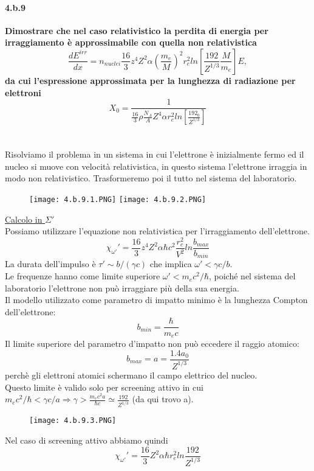 \documentclass[twoside]{article}
\begin{document}
\paragraph{4.b.9}\textbf{Dimostrare che nel caso relativistico la perdita di energia per irraggiamento è approssimabile con quella non relativistica
\[
\frac{dE^{irr}}{dx}=n_{nuclei}\frac{16}{3}z^4Z^2\alpha \left(\frac{m_e}{M} \right)^2 r_e^2 ln\left[ \frac{192}{Z^{1/3}}\frac{M}{m_e} \right]E,
\]
da cui l'espressione approssimata per la lunghezza di radiazione per elettroni
\[
X_0=\frac{1}{\frac{16}{3}\rho \frac{N_A}{A}Z^4 \alpha r_e^2 ln\left[\frac{192_0}{Z^{1/3}} \right]}
\]
}\\
\\
Risolviamo il problema in un sistema in cui l'elettrone è inizialmente fermo ed il nucleo si muove con velocità relativistica, in questo sistema l'elettrone irraggia in modo non relativistico. Trasformeremo poi il tutto nel sistema del laboratorio.
\begin{figure}[H]
    \centering
    \texttt{[image: 4.b.9.1.PNG]}
    \texttt{[image: 4.b.9.2.PNG]}
\end{figure}
\underline{Calcolo in $\Sigma'$}\\
Possiamo utilizzare l'equazione non relativistica per l'irraggiamento dell'elettrone.
\begin{equation}
    \chi_{\omega'}'=\frac{16}{3}z^4Z^2\alpha\hbar c^2 \frac{r_e^2}{V^2}ln\frac{b_{max}}{b_{min}}
\end{equation}
La durata dell'impulso è $\tau'\sim b/(\gamma c)$ che implica $\omega'< \gamma c/b$.\\
Le frequenze hanno come limite superiore $\omega'<m_ec^2/\hbar$, poiché nel sistema del laboratorio l'elettrone non può irraggiare più della sua energia.\\
Il modello utilizzato come parametro di impatto minimo è la lunghezza Compton dell'elettrone:
\begin{equation*}
    b_{min}=\frac{\hbar}{m_e c}
\end{equation*}
Il limite superiore del parametro d'impatto non può eccedere il raggio atomico:
\begin{equation*}
    b_{max}=a=\frac{1.4 a_0}{Z^{1/3}}
\end{equation*}
perchè gli elettroni atomici schermano il campo elettrico del nucleo.\\
\warning Questo limite è valido solo per screening attivo in cui $m_ec^2/\hbar<\gamma c/a \Rightarrow\gamma>\frac{m_ec^2a}{\hbar c} \simeq \frac{192}{Z^{1/3}}$ (da qui trovo a).
\begin{figure}[H]
    \centering
    \texttt{[image: 4.b.9.3.PNG]}
\end{figure}
Nel caso di screening attivo abbiamo quindi 
\begin{equation*}
    \chi_{\omega'}'=\frac{16}{3}Z^2\alpha\hbar r_e^2ln\frac{192}{Z^{1/3}}
\end{equation*}
\end{document}

